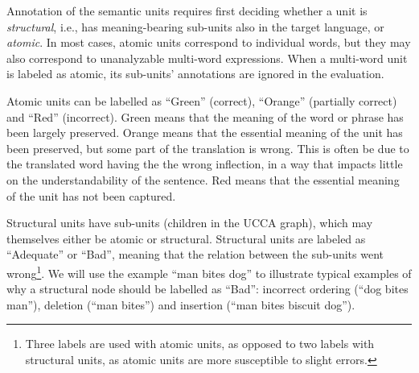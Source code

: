 \documentclass[11pt,letterpaper]{article}
\newcommand{\XXX}[1]{{\color{red}XXX #1}} %
\begin{document}
Annotation of the semantic units requires first deciding whether
a unit is {\it structural}, i.e., has meaning-bearing sub-units also in the
target language,
or {\it atomic}. In most cases, atomic units
correspond to individual words, but they may also correspond to unanalyzable
multi-word expressions.
When a multi-word unit is labeled as atomic, its sub-units' annotations are ignored
in the evaluation.

Atomic units can be labelled as ``Green'' (correct), ``Orange'' (partially correct)
and ``Red'' (incorrect). 
Green means that the meaning of the word or phrase has been largely preserved.
Orange means that the essential meaning of the unit has been preserved,
but some part of the translation is wrong.
This is often be due to the translated word having the the wrong inflection,
in a way that impacts little on the understandability of the sentence.
Red means that the essential meaning of the unit has not been captured.

Structural units have sub-units (children in the UCCA graph), which may themselves
either be atomic or structural.
Structural units are labeled as ``Adequate'' or ``Bad'', meaning
that the relation between the sub-units went wrong\footnote{
  Three labels are used with atomic units, as opposed to two labels with structural units,
as atomic units are more susceptible to slight errors.}.
We will use the example ``man bites dog'' to illustrate typical examples of why a structural node
should be labelled as ``Bad'':
incorrect ordering (``dog bites man''), 
deletion (``man bites'') and insertion (``man bites biscuit dog''). 
\end{document}

